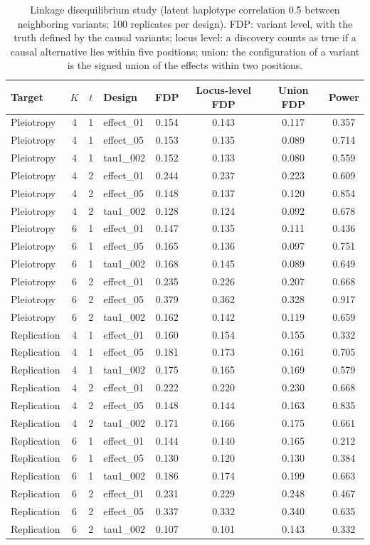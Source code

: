 \begin{table}[!htbp]
\centering
\caption{Linkage disequilibrium study (latent haplotype correlation 0.5 between neighboring variants; 100 replicates per design). FDP: variant level, with the truth defined by the causal variants; locus level: a discovery counts as true if a causal alternative lies within five positions; union: the configuration of a variant is the signed union of the effects within two positions.}\label{tab:ld}
\small
\begin{tabular}{lccl cccc}
\toprule
Target & $K$ & $t$ & Design & FDP & Locus-level FDP & Union FDP & Power\\
\midrule
Pleiotropy & 4 & 1 & effect\_01 & 0.154 & 0.143 & 0.117 & 0.357\\
Pleiotropy & 4 & 1 & effect\_05 & 0.153 & 0.135 & 0.089 & 0.714\\
Pleiotropy & 4 & 1 & tau1\_002 & 0.152 & 0.133 & 0.080 & 0.559\\
Pleiotropy & 4 & 2 & effect\_01 & 0.244 & 0.237 & 0.223 & 0.609\\
Pleiotropy & 4 & 2 & effect\_05 & 0.148 & 0.137 & 0.120 & 0.854\\
Pleiotropy & 4 & 2 & tau1\_002 & 0.128 & 0.124 & 0.092 & 0.678\\
Pleiotropy & 6 & 1 & effect\_01 & 0.147 & 0.135 & 0.111 & 0.436\\
Pleiotropy & 6 & 1 & effect\_05 & 0.165 & 0.136 & 0.097 & 0.751\\
Pleiotropy & 6 & 1 & tau1\_002 & 0.168 & 0.145 & 0.089 & 0.649\\
Pleiotropy & 6 & 2 & effect\_01 & 0.235 & 0.226 & 0.207 & 0.668\\
Pleiotropy & 6 & 2 & effect\_05 & 0.379 & 0.362 & 0.328 & 0.917\\
Pleiotropy & 6 & 2 & tau1\_002 & 0.162 & 0.142 & 0.119 & 0.659\\
Replication & 4 & 1 & effect\_01 & 0.160 & 0.154 & 0.155 & 0.332\\
Replication & 4 & 1 & effect\_05 & 0.181 & 0.173 & 0.161 & 0.705\\
Replication & 4 & 1 & tau1\_002 & 0.175 & 0.165 & 0.169 & 0.579\\
Replication & 4 & 2 & effect\_01 & 0.222 & 0.220 & 0.230 & 0.668\\
Replication & 4 & 2 & effect\_05 & 0.148 & 0.144 & 0.163 & 0.835\\
Replication & 4 & 2 & tau1\_002 & 0.171 & 0.166 & 0.175 & 0.661\\
Replication & 6 & 1 & effect\_01 & 0.144 & 0.140 & 0.165 & 0.212\\
Replication & 6 & 1 & effect\_05 & 0.130 & 0.120 & 0.130 & 0.384\\
Replication & 6 & 1 & tau1\_002 & 0.186 & 0.174 & 0.199 & 0.663\\
Replication & 6 & 2 & effect\_01 & 0.231 & 0.229 & 0.248 & 0.467\\
Replication & 6 & 2 & effect\_05 & 0.337 & 0.332 & 0.340 & 0.635\\
Replication & 6 & 2 & tau1\_002 & 0.107 & 0.101 & 0.143 & 0.332\\
\bottomrule
\end{tabular}
\end{table}
